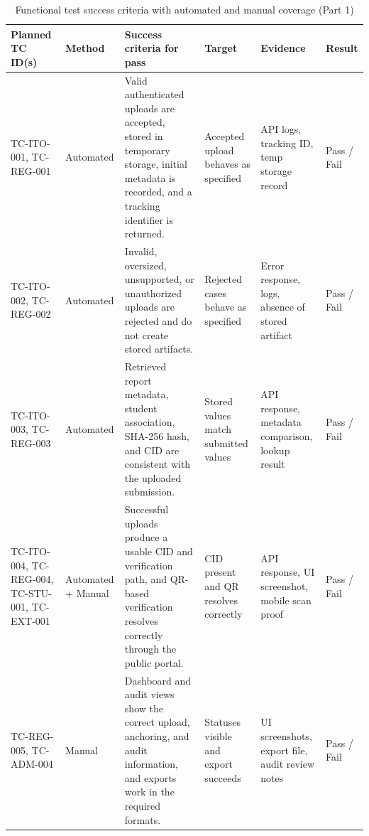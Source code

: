 \begin{table}[H]
  \centering
  \smalltable
  \footnotesize
  {%
  \setlength{\tabcolsep}{5pt}%
  \renewcommand{\arraystretch}{1.35}%

  \begin{tabular}{|>{\raggedright\arraybackslash}p{}|
                  >{\raggedright\arraybackslash}p{}|
                  >{\raggedright\arraybackslash}p{}|
                  >{\raggedright\arraybackslash}p{}|
                  >{\raggedright\arraybackslash}p{}|
                  >{\raggedright\arraybackslash}p{}|}
    \hline
    \textbf{Planned TC ID(s)} &
    \textbf{Method} &
    \textbf{Success criteria for pass} &
    \textbf{Target} &
    \textbf{Evidence} &
    \textbf{Result} \\
    \hline\hline

    TC-ITO-001, TC-REG-001 &
    Automated &
    Valid authenticated uploads are accepted, stored in temporary storage,
    initial metadata is recorded, and a tracking identifier is returned. &
    Accepted upload behaves as specified &
    API logs, tracking ID, temp storage record &
    Pass / Fail \\
    \hline

    TC-ITO-002, TC-REG-002 &
    Automated &
    Invalid, oversized, unsupported, or unauthorized uploads are rejected and
    do not create stored artifacts. &
    Rejected cases behave as specified &
    Error response, logs, absence of stored artifact &
    Pass / Fail \\
    \hline

    TC-ITO-003, TC-REG-003 &
    Automated &
    Retrieved report metadata, student association, SHA-256 hash, and CID are
    consistent with the uploaded submission. &
    Stored values match submitted values &
    API response, metadata comparison, lookup result &
    Pass / Fail \\
    \hline

    TC-ITO-004, TC-REG-004, TC-STU-001, TC-EXT-001 &
    Automated + Manual &
    Successful uploads produce a usable CID and verification path, and QR-based
    verification resolves correctly through the public portal. &
    CID present and QR resolves correctly &
    API response, UI screenshot, mobile scan proof &
    Pass / Fail \\
    \hline

    TC-REG-005, TC-ADM-004 &
    Manual &
    Dashboard and audit views show the correct upload, anchoring, and audit
    information, and exports work in the required formats. &
    Statuses visible and export succeeds &
    UI screenshots, export file, audit review notes &
    Pass / Fail \\
    \hline

  \end{tabular}
  }%
  \captionsetup{type=table}
  \caption{Functional test success criteria with automated and manual coverage (Part 1)}
  \label{tab:functional-success-criteria-a}
\end{table}

